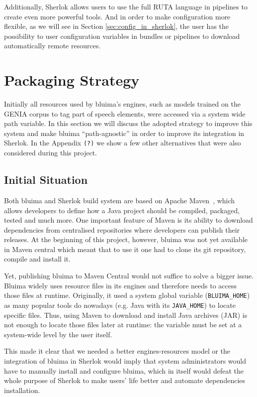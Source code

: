 \documentclass{article}
\newcommand{\VAR}[1]{\mbox{\texttt{#1}}}
\newcommand{\JAR}{JAR\xspace}
\newcommand{\TODO}[1]{\texttt{\textcolor{YellowOrange}{(#1)}}} %
\begin{document}
Additionally, Sherlok allows users to use the full RUTA language in pipelines to create even more
powerful tools. And in order to make configuration more flexible, as we will see in Section
\ref{sec:config_in_sherlok}, the user has the possibility to user configuration variables in bundles
or pipelines to download automatically remote resources.

\section{Packaging Strategy}

Initially all resources used by bluima's engines, such as models trained on the GENIA corpus
\cite{genia} to tag part of speech elements, were accessed via a system wide path variable. In this
section we will discuss the adopted strategy to improve this system and make bluima
``path-agnostic'' in order to improve its integration in Sherlok. In the Appendix \TODO{?} we show a
few other alternatives that were also considered during this project.

\subsection{Initial Situation}

Both bluima and Sherlok build system are based on Apache Maven~\cite{maven}, which allows developers
to define how a Java project should be compiled, packaged, tested and much more. One important
feature of Maven is its ability to download dependencies from centralised repositories where
developers can publish their releases. At the beginning of this project, however, bluima was not yet
available in Maven central which meant that to use it one had to clone its git repository, compile
and install it.

Yet, publishing bluima to Maven Central would not suffice to solve a bigger issue. Bluima widely
uses resource files in its engines and therefore needs to access those files at runtime. Originally,
it used a system global variable (\VAR{BLUIMA\_HOME}) as many popular tools do nowadays (e.g. Java
with its \VAR{JAVA\_HOME}) to locate specific files. Thus, using Maven to download and install Java
archives (\JAR) is not enough to locate those files later at runtime: the variable must be set at a
system-wide level by the user itself.

This made it clear that we needed a better engines-resources model or the integration of bluima in
Sherlok would imply that system administrators would have to manually install and configure bluima,
which in itself would defeat the whole purpose of Sherlok to make users' life better and automate
dependencies installation.
\end{document}
